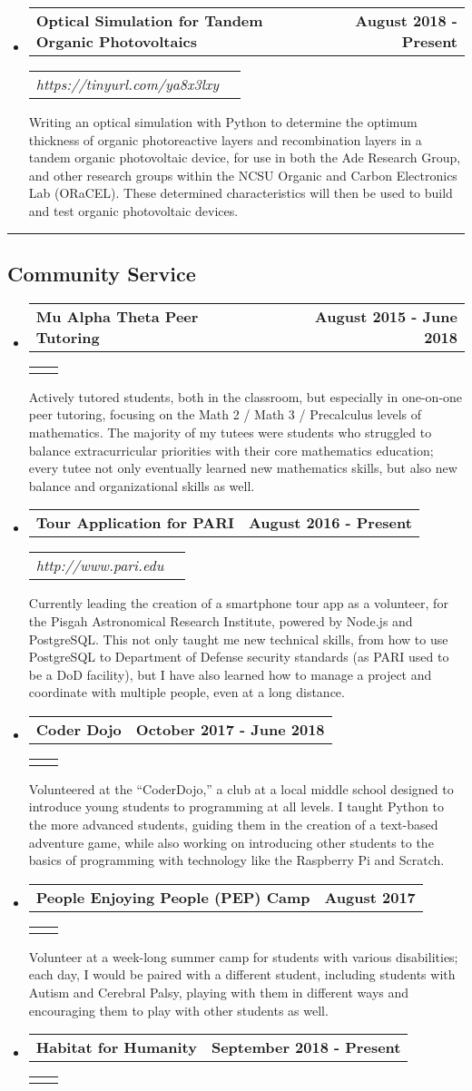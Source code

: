 \documentclass[10pt,letterpaper]{article}
\makeatletter
\newcommand{\headerrow}[2]
{\begin{tabular*}{\linewidth}{l@{\extracolsep{\fill}}r}
	#1 &
	#2 \\
\end{tabular*}}
\newcommand{\basicitem}[5]
{
	\item
	\headerrow
		{\textbf{#1}}
		{\textbf{#2}}
	\ifthenelse{\equal{#3}{} \AND \equal{#4}{}}
		{}
		{
			\headerrow
			{\emph{#3}}
			{\emph{#4}}
		}
	#5
}
\makeatother
\begin{document}
\begin{itemize}
	\basicitem
		{Optical Simulation for Tandem Organic Photovoltaics}
		{August 2018 - Present}
		{https://tinyurl.com/ya8x3lxy}
		{}
		{Writing an optical simulation with Python to determine the optimum thickness of organic photoreactive layers and recombination layers in a tandem organic photovoltaic device, for use in both the Ade Research Group, and other research groups within the NCSU Organic and Carbon Electronics Lab (ORaCEL). These determined characteristics will then be used to build and test organic photovoltaic devices.}

\end{itemize}

\hrule
\vspace{-0.4em}
\subsection*{Community Service}
\begin{itemize}
	\parskip=0.1em

	\basicitem
		{Mu Alpha Theta Peer Tutoring}
		{August 2015 - June 2018}
		{}
		{}
		{Actively tutored students, both in the classroom, but especially in one-on-one peer tutoring, focusing on the Math 2 / Math 3 / Precalculus levels of mathematics. The majority of my tutees were students who struggled to balance extracurricular priorities with their core mathematics education; every tutee not only eventually learned new mathematics skills, but also new balance and organizational skills as well.}

	\basicitem
		{Tour Application for PARI}
		{August 2016 - Present}
		{http://www.pari.edu}
		{}
		{Currently leading the creation of a smartphone tour app as a volunteer, for the Pisgah Astronomical Research Institute, powered by Node.js and PostgreSQL. This not only taught me new technical skills, from how to use PostgreSQL to Department of Defense security standards (as PARI used to be a DoD facility), but I have also learned how to manage a project and coordinate with multiple people, even at a long distance.}

	\basicitem
		{Coder Dojo}
		{October 2017 - June 2018}
		{}
		{}
		{Volunteered at the “CoderDojo,” a club at a local middle school designed to introduce young students to programming at all levels. I taught Python to the more advanced students, guiding them in the creation of a text-based adventure game, while also working on introducing other students to the basics of programming with technology like the Raspberry Pi and Scratch.}

	\basicitem
		{People Enjoying People (PEP) Camp}
		{August 2017}
		{}
		{}
		{Volunteer at a week-long summer camp for students with various disabilities; each day, I would be paired with a different student, including students with Autism and Cerebral Palsy, playing with them in different ways and encouraging them to play with other students as well.}

	\basicitem
		{Habitat for Humanity}
		{September 2018 - Present}
		{}
		{}
		{}
	
\end{itemize}
\end{document}

